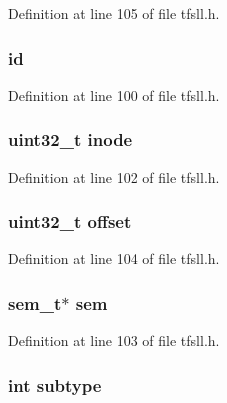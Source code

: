 Definition at line 105 of file tfsll.\+h.

\hypertarget{struct_file_a3be1ad207c610c62db1aefadd4f7b1ad}{}
\subsubsection[{id}]{ id}\label{struct_file_a3be1ad207c610c62db1aefadd4f7b1ad}


Definition at line 100 of file tfsll.\+h.

\hypertarget{struct_file_a84dc3916ea975b79482a6d01f78c3d9f}{}
\subsubsection[{inode}]{\setlength{\rightskip}{0pt plus 5cm}uint32\+\_\+t inode}\label{struct_file_a84dc3916ea975b79482a6d01f78c3d9f}


Definition at line 102 of file tfsll.\+h.

\hypertarget{struct_file_a894bdfa2d603d8343f8ef01dda6fcd23}{}
\subsubsection[{offset}]{\setlength{\rightskip}{0pt plus 5cm}uint32\+\_\+t offset}\label{struct_file_a894bdfa2d603d8343f8ef01dda6fcd23}


Definition at line 104 of file tfsll.\+h.

\hypertarget{struct_file_a5c905d8d60d9e4d58e9a4a5ec07ec44c}{}
\subsubsection[{sem}]{\setlength{\rightskip}{0pt plus 5cm}sem\+\_\+t$\ast$ sem}\label{struct_file_a5c905d8d60d9e4d58e9a4a5ec07ec44c}


Definition at line 103 of file tfsll.\+h.

\hypertarget{struct_file_a7aacd365cfc725fe569f28df862fa5eb}{}
\subsubsection[{subtype}]{\setlength{\rightskip}{0pt plus 5cm}int subtype}\label{struct_file_a7aacd365cfc725fe569f28df862fa5eb}


